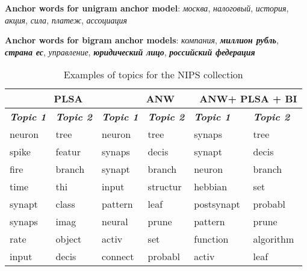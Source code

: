 \documentclass[runningheads,a4paper]{llncs}
\begin{document}
	\noindent \textbf{Anchor words for unigram anchor model}: \emph{москва}, \emph{налоговый}, \emph{история}, \emph{акция}, \emph{сила}, \emph{платеж}, \emph{ассоциация}
	
	
	\noindent \textbf{Anchor words for bigram anchor models}: \emph{компания}, \textbf{\emph{миллион рубль}}, \textbf{\emph{страна ес}}, \emph{управление},  \textbf{\emph{юридический лицо}}, \textbf{\emph{российский федерация}}
	\begin{table}[H]
		\centering
		\caption{Examples of topics for the NIPS collection}
		\label{tab:nips}
		\begin{tabular}{|l|l|l|l|l|l|}
			\hline
			\multicolumn{2}{|l|}{\textbf{~~~~~~~~PLSA}}           & \multicolumn{2}{l|}{\textbf{~~~~~~~~ANW}}             & \multicolumn{2}{l|}{\textbf{~ANW+ PLSA + BI}}         \\ \hline
			\textit{\textbf{Topic 1}} & \textit{\textbf{Topic 2}} & \textit{\textbf{Topic 1}} & \textit{\textbf{Topic 2}} & \textit{\textbf{Topic 1}} & \textit{\textbf{Topic 2}} \\ \hline
			neuron                    & tree                      & neuron                    & tree                      & synaps                    & tree                      \\
			spike                     & featur                    & synaps                    & decis                     & synapt                    & decis                     \\
			fire                      & branch                    & synapt                    & branch                    & neuron                    & branch                    \\
			time                      & thi                       & input                     & structur                  & hebbian                   & set                       \\
			synapt                    & class                     & pattern                   & leaf                      & postsynapt                & probabl                   \\
			synaps                    & imag                      & neural                    & prune                     & pattern                   & prune                     \\
			rate                      & object                    & activ                     & set                       & function                  & algorithm                 \\
			input                     & decis                     & connect                   & probabl                   & activ                     & leaf                      \\ \hline
		\end{tabular}
	\end{table}
	
\end{document}
